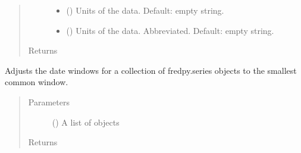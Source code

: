 \documentclass[letterpaper,10pt,openany,oneside,english]{sphinxmanual}
\begin{document}
\begin{fulllineitems}
\begin{quote}
\begin{description}
\begin{itemize}
\item {} 
 () \textendash{} Units of the data. Default: empty string.

\item {} 
 () \textendash{} Units of the data. Abbreviated. Default: empty string.

\end{itemize}

\item[{Returns}] \leavevmode
{\hyperref[\detokenize{series_class:fredpy.series}]{}}

\end{description}\end{quote}

\end{fulllineitems}


\begin{fulllineitems}
\label{\detokenize{additional_functions:fredpy.window_equalize}}
Adjusts the date windows for a collection of fredpy.series objects to the smallest common window.
\begin{quote}\begin{description}
\item[{Parameters}] \leavevmode
{} () \textendash{} A list of {\hyperref[\detokenize{series_class:fredpy.series}]{}} objects

\item[{Returns}] \leavevmode


\end{description}\end{quote}

\end{fulllineitems}
\end{document}
